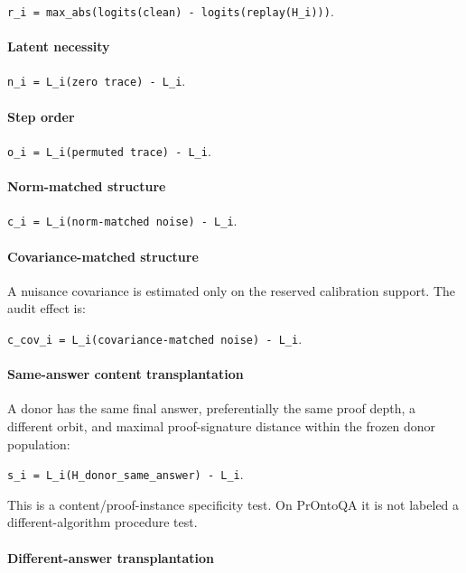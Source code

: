 \documentclass[
  10pt,
]{article}
\begin{document}
\texttt{r\_i\ =\ max\_abs(logits(clean)\ -\ logits(replay(H\_i)))}.

\paragraph{Latent necessity}\label{latent-necessity}

\texttt{n\_i\ =\ L\_i(zero\ trace)\ -\ L\_i}.

\paragraph{Step order}\label{step-order}

\texttt{o\_i\ =\ L\_i(permuted\ trace)\ -\ L\_i}.

\paragraph{Norm-matched structure}\label{norm-matched-structure}

\texttt{c\_i\ =\ L\_i(norm-matched\ noise)\ -\ L\_i}.

\paragraph{Covariance-matched
structure}\label{covariance-matched-structure}

A nuisance covariance is estimated only on the reserved calibration
support. The audit effect is:

\texttt{c\_cov\_i\ =\ L\_i(covariance-matched\ noise)\ -\ L\_i}.

\paragraph{Same-answer content
transplantation}\label{same-answer-content-transplantation}

A donor has the same final answer, preferentially the same proof depth,
a different orbit, and maximal proof-signature distance within the
frozen donor population:

\texttt{s\_i\ =\ L\_i(H\_donor\_same\_answer)\ -\ L\_i}.

This is a content/proof-instance specificity test. On PrOntoQA it is not
labeled a different-algorithm procedure test.

\paragraph{Different-answer
transplantation}\label{different-answer-transplantation}
\end{document}
